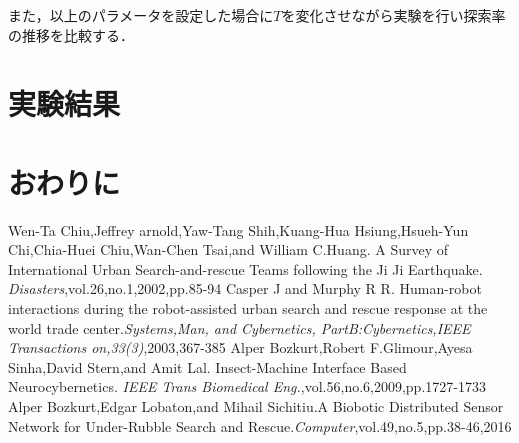 \documentclass[a4paper,11pt]{jarticle}
\begin{document}
	また，以上のパラメータを設定した場合に$T$を変化させながら実験を行い探索率の推移を比較する．
	\section{実験結果}
	\section{おわりに}
	\begin{thebibliography}{99}
		 Wen-Ta Chiu,Jeffrey arnold,Yaw-Tang Shih,Kuang-Hua Hsiung,Hsueh-Yun Chi,Chia-Huei Chiu,Wan-Chen Tsai,and William C.Huang. A Survey of International Urban Search-and-rescue Teams following the Ji Ji Earthquake. \textit{Disasters},vol.26,no.1,2002,pp.85-94
		Casper J and Murphy R R. Human-robot interactions during the robot-assisted urban search and rescue response at the world trade center.\textit{Systems,Man, and Cybernetics, PartB:Cybernetics,IEEE Transactions on,33(3)},2003,367-385
		Alper Bozkurt,Robert F.Glimour,Ayesa Sinha,David Stern,and Amit Lal. Insect-Machine Interface Based Neurocybernetics. \textit{IEEE Trans Biomedical Eng.},vol.56,no.6,2009,pp.1727-1733
		Alper Bozkurt,Edgar Lobaton,and Mihail Sichitiu.A Biobotic Distributed Sensor Network for Under-Rubble Search and Rescue.\textit{Computer},vol.49,no.5,pp.38-46,2016
		
		
	\end{thebibliography}
\end{document}
